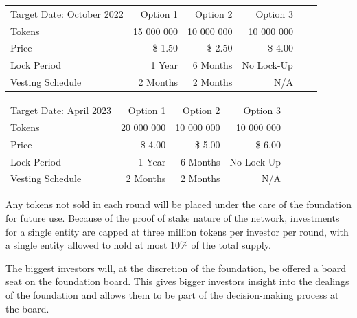 \documentclass{article}
\begin{document}
\renewcommand{\arraystretch}{1.5}%
\begin{flushleft}
	\hypersetup{colorlinks = true, urlcolor = black, citecolor = black, linkcolor = black}
	\center \small
	\begin{tabular}{lrrrrr}
		\rowcolor{orange}\color{black}Target Date: October 2022\hspace{2cm} & \color{black}Option 1 & \color{black}Option 2 & \color{black}Option 3\\
		Tokens                               &  15 000 000 & 10 000 000 & 10 000 000 \\
		\rowcolor{headerbgl}Price            &  \$ 1.50    & \$ 2.50    & \$ 4.00 \\
		Lock Period                          &  1 Year     &  6 Months  & No Lock-Up \\
		\rowcolor{headerbgl}Vesting Schedule &  2 Months   & 2 Months & N/A 
	\end{tabular}
\end{flushleft}

\renewcommand{\arraystretch}{1.5}%
\begin{flushleft}
	\hypersetup{colorlinks = true, urlcolor = black, citecolor = black, linkcolor = black}
	\center \small
	\begin{tabular}{lrrrrr}
		\rowcolor{orange}\color{black}Target Date: April 2023\hspace{2.4cm} & \color{black}Option 1 & \color{black}Option 2 & \color{black}Option 3\\
		Tokens                               &  20 000 000 & 10 000 000 & 10 000 000 \\
		\rowcolor{headerbgl}Price            &  \$ 4.00    & \$ 5.00    & \$ 6.00 \\
		Lock Period                          &  1 Year     &  6 Months  & No Lock-Up \\
		\rowcolor{headerbgl}Vesting Schedule &  2 Months   & 2 Months & N/A 
	\end{tabular}
\end{flushleft}

\vspace{0.6cm}
\noindent Any tokens not sold in each round will be placed under the care of the foundation for future use. Because of the proof of stake nature of the  network, investments for a single entity are capped at three million tokens per investor per round, with a single entity allowed to hold at most 10\% of the total supply.

The biggest investors will, at the discretion of the foundation, be offered a board seat on the foundation board. This gives bigger investors insight into the dealings of the foundation and allows them to be part of the decision-making process at the board.
\end{document}
